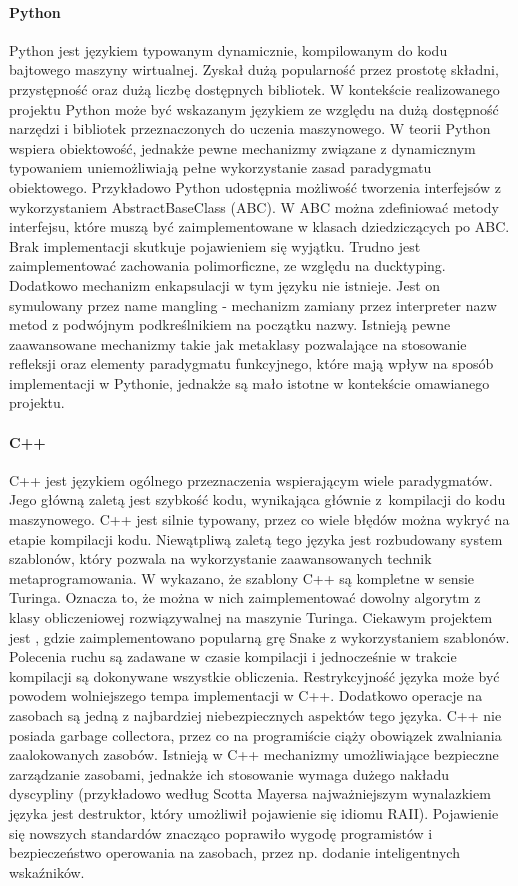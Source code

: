 \documentclass[12pt]{article}
\begin{document}
\paragraph{Python}
Python jest językiem typowanym dynamicznie, kompilowanym do kodu bajtowego maszyny wirtualnej. Zyskał dużą popularność przez prostotę składni, przystępność oraz dużą liczbę dostępnych bibliotek. W kontekście realizowanego projektu Python może być wskazanym językiem ze względu na dużą dostępność narzędzi i bibliotek przeznaczonych do uczenia maszynowego. W teorii Python wspiera obiektowość, jednakże pewne mechanizmy związane z dynamicznym typowaniem uniemożliwiają pełne wykorzystanie zasad paradygmatu obiektowego. Przykładowo Python udostępnia możliwość tworzenia interfejsów z wykorzystaniem AbstractBaseClass (ABC). W ABC można zdefiniować metody interfejsu, które muszą być zaimplementowane w klasach dziedziczących po ABC. Brak implementacji skutkuje pojawieniem się wyjątku. Trudno jest zaimplementować zachowania polimorficzne, ze względu na ducktyping. Dodatkowo mechanizm enkapsulacji w tym języku nie istnieje. Jest on symulowany przez name mangling - mechanizm zamiany przez interpreter nazw metod z podwójnym podkreślnikiem na początku nazwy. Istnieją pewne zaawansowane mechanizmy takie jak metaklasy pozwalające na stosowanie refleksji oraz elementy paradygmatu funkcyjnego, które mają wpływ na sposób implementacji w Pythonie, jednakże są mało istotne w kontekście omawianego projektu.

\paragraph{C++}
C++ jest językiem ogólnego przeznaczenia wspierającym wiele paradygmatów. Jego główną zaletą jest szybkość kodu, wynikająca głównie z~kompilacji do kodu maszynowego. C++ jest silnie typowany, przez co wiele błędów można wykryć na etapie kompilacji kodu. Niewątpliwą zaletą tego języka jest rozbudowany system szablonów, który pozwala na wykorzystanie zaawansowanych technik metaprogramowania. W \cite{Cpp_turing_complete} wykazano, że szablony C++ są kompletne w sensie Turinga. Oznacza to, że można w nich zaimplementować dowolny algorytm z klasy obliczeniowej rozwiązywalnej na maszynie Turinga. Ciekawym projektem jest \cite{Cpp_snake_compile_time}, gdzie zaimplementowano popularną grę Snake z wykorzystaniem szablonów. Polecenia ruchu są zadawane w czasie kompilacji i jednocześnie w trakcie kompilacji są dokonywane wszystkie obliczenia. Restrykcyjność języka może być powodem wolniejszego tempa implementacji w C++. Dodatkowo operacje na zasobach są jedną z najbardziej niebezpiecznych aspektów tego języka. C++ nie posiada garbage collectora, przez co na programiście ciąży obowiązek zwalniania zaalokowanych zasobów. Istnieją w C++ mechanizmy umożliwiające bezpieczne zarządzanie zasobami, jednakże ich stosowanie wymaga dużego nakładu dyscypliny (przykładowo według Scotta Mayersa najważniejszym wynalazkiem języka jest destruktor, który umożliwił pojawienie się idiomu RAII). Pojawienie się nowszych standardów znacząco poprawiło wygodę programistów i bezpieczeństwo operowania na zasobach, przez np. dodanie inteligentnych wskaźników.
\end{document}
